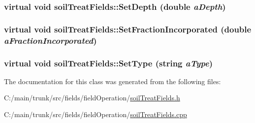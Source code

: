 \label{classsoil_treat_fields_a575166b12e7900f9b321b2ac1ad8e1ea}
\hypertarget{classsoil_treat_fields_ad838ce1a0d1cd7bac15f53785026753e}{
\subsubsection[{SetDepth}]{\setlength{\rightskip}{0pt plus 5cm}virtual void soilTreatFields::SetDepth (double {\em aDepth})}}
\label{classsoil_treat_fields_ad838ce1a0d1cd7bac15f53785026753e}
\hypertarget{classsoil_treat_fields_ac6d918f9c12375c55641c4cacf737b85}{
\subsubsection[{SetFractionIncorporated}]{\setlength{\rightskip}{0pt plus 5cm}virtual void soilTreatFields::SetFractionIncorporated (double {\em aFractionIncorporated})}}
\label{classsoil_treat_fields_ac6d918f9c12375c55641c4cacf737b85}
\hypertarget{classsoil_treat_fields_a9639937ca350ed628e772c862d1d59bd}{
\subsubsection[{SetType}]{\setlength{\rightskip}{0pt plus 5cm}virtual void soilTreatFields::SetType (string {\em aType})}}
\label{classsoil_treat_fields_a9639937ca350ed628e772c862d1d59bd}


The documentation for this class was generated from the following files:\begin{DoxyCompactItemize}
\item 
C:/main/trunk/src/fields/fieldOperation/\hyperlink{soil_treat_fields_8h}{soilTreatFields.h}\item 
C:/main/trunk/src/fields/fieldOperation/\hyperlink{soil_treat_fields_8cpp}{soilTreatFields.cpp}\end{DoxyCompactItemize}
